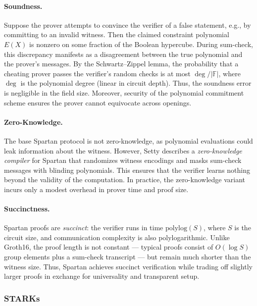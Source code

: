 \paragraph{Soundness.}
Suppose the prover attempts to convince the verifier of a false statement, e.g., by committing to an invalid witness. 
Then the claimed constraint polynomial $E(X)$ is nonzero on some fraction of the Boolean hypercube. 
During sum-check, this discrepancy manifests as a disagreement between the true polynomial and the prover’s messages. 
By the Schwartz–Zippel lemma, the probability that a cheating prover passes the verifier’s random checks is at most $\deg/|\mathbb{F}|$, 
where $\deg$ is the polynomial degree (linear in circuit depth). 
Thus, the soundness error is negligible in the field size. 
Moreover, security of the polynomial commitment scheme ensures the prover cannot equivocate across openings.

\paragraph{Zero-Knowledge.}
The base Spartan protocol is not zero-knowledge, as polynomial evaluations could leak information about the witness. 
However, Setty \cite{setty2020spartan} describes a \emph{zero-knowledge compiler} for Spartan that randomizes witness encodings 
and masks sum-check messages with blinding polynomials. 
This ensures that the verifier learns nothing beyond the validity of the computation. 
In practice, the zero-knowledge variant incurs only a modest overhead in prover time and proof size.

\paragraph{Succinctness.}
Spartan proofs are \emph{succinct}: the verifier runs in time $\mathrm{polylog}(S)$, where $S$ is the circuit size, 
and communication complexity is also polylogarithmic. 
Unlike Groth16, the proof length is not constant — typical proofs consist of $O(\log S)$ group elements plus a sum-check transcript — 
but remain much shorter than the witness size. 
Thus, Spartan achieves succinct verification while trading off slightly larger proofs in exchange for universality and transparent setup.


\subsubsection{STARKs}

